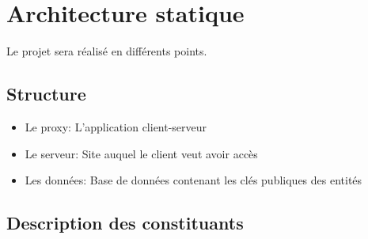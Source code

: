 \documentclass[a4paper,11pt,french]{article}
\begin{document}




\section{Architecture statique}
Le projet sera réalisé en différents points. 
\subsection{Structure}
\begin{itemize}
\item Le proxy: L'application client-serveur
\item Le serveur: Site auquel le client veut avoir accès
\item Les données: Base de données contenant les clés publiques des entités
\end{itemize}




\subsection{Description des constituants}
\end{document}
